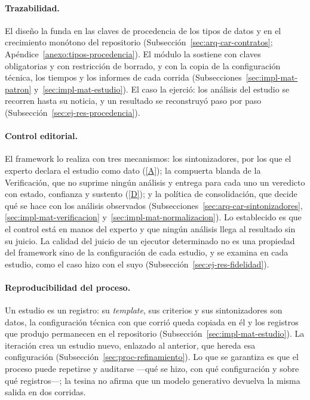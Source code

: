 \documentclass[12pt]{report}
\DeclareRobustCommand{\resp}[1]{\hyperref[tab:registro-responsabilidades]{\textcolor{respcolor}{[#1]}}}
\begin{document}
\paragraph{Trazabilidad.} El diseño la funda en las claves de procedencia de los tipos de datos y en el crecimiento monótono del repositorio (Subsección~\ref{sec:arq-car-contratos}; Apéndice~\ref{anexo:tipos-procedencia}). El módulo la sostiene con claves obligatorias y con restricción de borrado, y con la copia de la configuración técnica, los tiempos y los informes de cada corrida (Subsecciones~\ref{sec:impl-mat-patron} y~\ref{sec:impl-mat-estudio}). El caso la ejerció: los análisis del estudio se recorren hasta su noticia, y un resultado se reconstruyó paso por paso (Subsección~\ref{sec:ej-res-procedencia}).

\paragraph{Control editorial.} El framework lo realiza con tres mecanismos: los sintonizadores, por los que el experto declara el estudio como dato (\resp{A}); la compuerta blanda de la Verificación, que no suprime ningún análisis y entrega para cada uno un veredicto con estado, confianza y sustento (\resp{D}); y la política de consolidación, que decide qué se hace con los análisis observados (Subsecciones~\ref{sec:arq-car-sintonizadores}, \ref{sec:impl-mat-verificacion} y~\ref{sec:impl-mat-normalizacion}). Lo establecido es que el control está en manos del experto y que ningún análisis llega al resultado sin su juicio. La calidad del juicio de un ejecutor determinado no es una propiedad del framework sino de la configuración de cada estudio, y se examina en cada estudio, como el caso hizo con el suyo (Subsección~\ref{sec:ej-res-fidelidad}).

\paragraph{Reproducibilidad del proceso.} Un estudio es un registro: su \textit{template}, sus criterios y sus sintonizadores son datos, la configuración técnica con que corrió queda copiada en él y los registros que produjo permanecen en el repositorio (Subsección~\ref{sec:impl-mat-estudio}). La iteración crea un estudio nuevo, enlazado al anterior, que hereda esa configuración (Subsección~\ref{sec:proc-refinamiento}). Lo que se garantiza es que el proceso puede repetirse y auditarse ---qué se hizo, con qué configuración y sobre qué registros---; la tesina no afirma que un modelo generativo devuelva la misma salida en dos corridas.
\end{document}
